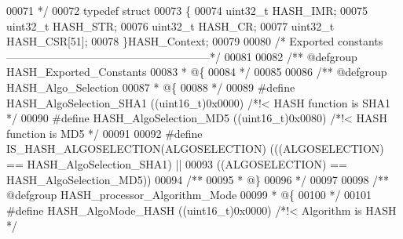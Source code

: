 \begin{DoxyCode}
00071 \textcolor{comment}{  */}
00072 \textcolor{keyword}{typedef} \textcolor{keyword}{struct}
00073 \{
00074   uint32\_t HASH_IMR;
00075   uint32\_t HASH_STR;
00076   uint32\_t HASH_CR;
00077   uint32\_t HASH_CSR[51];
00078 \}HASH\_Context;
00079 
00080 \textcolor{comment}{/* Exported constants --------------------------------------------------------*/}
00081 
00082 \textcolor{comment}{/** @defgroup HASH\_Exported\_Constants}
00083 \textcolor{comment}{  * @\{}
00084 \textcolor{comment}{  */}
00085 
00086 \textcolor{comment}{/** @defgroup HASH\_Algo\_Selection }
00087 \textcolor{comment}{  * @\{}
00088 \textcolor{comment}{  */}
00089 \textcolor{preprocessor}{#}\textcolor{preprocessor}{define} \textcolor{preprocessor}{HASH\_AlgoSelection\_SHA1}    \textcolor{preprocessor}{(}\textcolor{preprocessor}{(}\textcolor{preprocessor}{uint16\_t}\textcolor{preprocessor}{)}0x0000\textcolor{preprocessor}{)} \textcolor{comment}{/*!< HASH function is SHA1 */}
00090 \textcolor{preprocessor}{#}\textcolor{preprocessor}{define} \textcolor{preprocessor}{HASH\_AlgoSelection\_MD5}     \textcolor{preprocessor}{(}\textcolor{preprocessor}{(}\textcolor{preprocessor}{uint16\_t}\textcolor{preprocessor}{)}0x0080\textcolor{preprocessor}{)} \textcolor{comment}{/*!< HASH function is MD5 */}
00091 
00092 \textcolor{preprocessor}{#}\textcolor{preprocessor}{define} \textcolor{preprocessor}{IS\_HASH\_ALGOSELECTION}\textcolor{preprocessor}{(}\textcolor{preprocessor}{ALGOSELECTION}\textcolor{preprocessor}{)} \textcolor{preprocessor}{(}\textcolor{preprocessor}{(}\textcolor{preprocessor}{(}\textcolor{preprocessor}{ALGOSELECTION}\textcolor{preprocessor}{)} \textcolor{preprocessor}{==} 
      HASH_AlgoSelection_SHA1\textcolor{preprocessor}{)} \textcolor{preprocessor}{||}
00093                                               \textcolor{preprocessor}{(}\textcolor{preprocessor}{(}\textcolor{preprocessor}{ALGOSELECTION}\textcolor{preprocessor}{)} \textcolor{preprocessor}{==} 
      HASH_AlgoSelection_MD5\textcolor{preprocessor}{)}\textcolor{preprocessor}{)}
00094 \textcolor{comment}{/**}
00095 \textcolor{comment}{  * @\}}
00096 \textcolor{comment}{  */}
00097 
00098 \textcolor{comment}{/** @defgroup HASH\_processor\_Algorithm\_Mode }
00099 \textcolor{comment}{  * @\{}
00100 \textcolor{comment}{  */}
00101 \textcolor{preprocessor}{#}\textcolor{preprocessor}{define} \textcolor{preprocessor}{HASH\_AlgoMode\_HASH}         \textcolor{preprocessor}{(}\textcolor{preprocessor}{(}\textcolor{preprocessor}{uint16\_t}\textcolor{preprocessor}{)}0x0000\textcolor{preprocessor}{)} \textcolor{comment}{/*!< Algorithm is HASH */}

\end{DoxyCode}
